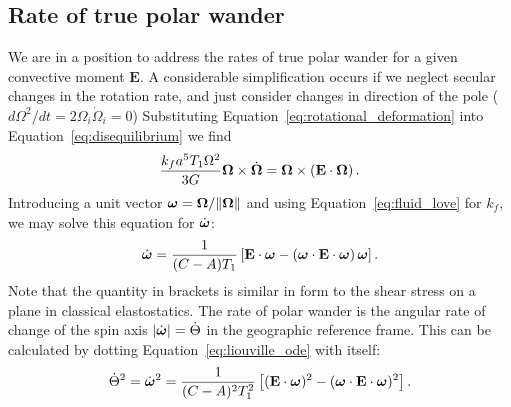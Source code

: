 \documentclass[extra,mreferee]{gji}
\begin{document}
\subsection{Rate of true polar wander}
\label{sec:tpw_rate}

We are in a position to address the rates of true polar wander for a given convective moment $\mathbf{E}$.
A considerable simplification occurs if we neglect secular changes in the rotation rate, and just consider changes in direction of the pole ($d \Omega^2 / dt = 2 {\Omega_i} \dot{ \Omega}_i = 0$)
Substituting Equation~\eqref{eq:rotational_deformation} into Equation~\eqref{eq:disequilibrium} we find
\begin{equation}
\frac{k_f a^5 T_1 \Omega^2}{3G}\mitbf{\Omega} \times \dot{\mitbf{\Omega} } = \mitbf{\Omega} \times \left( \mathbf{E} \cdot \mitbf{\Omega} \right).
\label{eq:liouville}
\end{equation}
Introducing a unit vector $\mitbf{\omega} = \mitbf{\Omega}/\|\mitbf{\Omega} \|$ and using Equation~\eqref{eq:fluid_love} for $k_f$,  we may solve this equation for $\dot{\mitbf{\omega}}$:
\begin{equation}
 \dot{\mitbf{\omega}}  = \frac{1}{(C-A)T_1} \left[ \mathbf{E} \cdot \mitbf{\omega} - \left( \mitbf{\omega} \cdot \mathbf{E} \cdot \mitbf{\omega}  \right) \mitbf{\omega} \right].
\label{eq:liouville_ode}
\end{equation}
Note that the quantity in brackets is similar in form to the shear stress on a plane in classical elastostatics.
The rate of polar wander is the angular rate of change of the spin axis $\left| \dot{\mitbf{\omega}} \right| = \dot{\Theta}$ in the geographic reference frame.
This can be calculated by dotting Equation~\eqref{eq:liouville_ode} with itself:
\begin{equation}
\dot{\Theta}^2 = \dot{\mitbf{\omega}}^2 = \frac{1}{(C-A)^2 T_1^2} \left[ (\mathbf{E}\cdot\mitbf{\omega})^2 - (\mitbf{\omega}\cdot\mathbf{E}\cdot\mitbf{\omega})^2 \right].
\label{eq:polar_wander_rate_tensor}
\end{equation}
\end{document}

